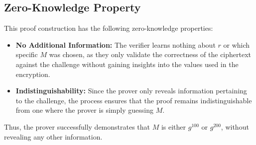 \documentclass[12pt]{article}
\begin{document}
\subsection{Zero-Knowledge Property}
This proof construction has the following zero-knowledge properties:
\begin{itemize}
    \item \textbf{No Additional Information:} The verifier learns nothing about \( r \) or which specific \( M \) was chosen, as they only validate the correctness of the ciphertext against the challenge without gaining insights into the values used in the encryption.
    \item \textbf{Indistinguishability:} Since the prover only reveals information pertaining to the challenge, the process ensures that the proof remains indistinguishable from one where the prover is simply guessing \( M \).
\end{itemize}


Thus, the prover successfully demonstrates that \( M \) is either \( g^{100} \) or \( g^{200} \), without revealing any other information.
\end{document}
